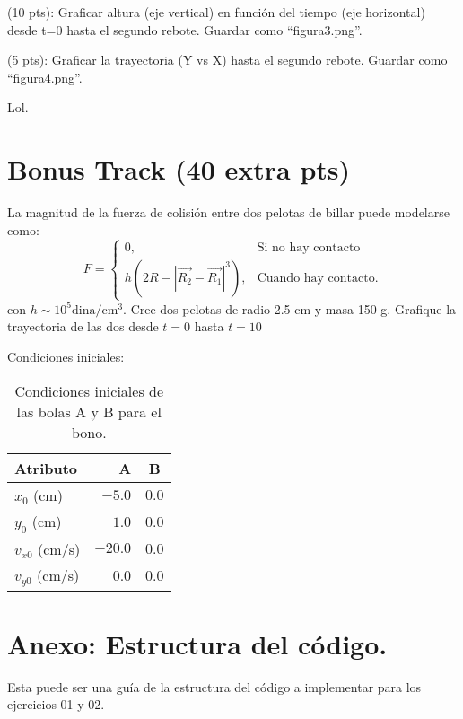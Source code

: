 \documentclass{article}
\begin{document}
(10 pts): Graficar altura (eje vertical) en función del tiempo (eje horizontal) desde t=0 hasta el segundo rebote. Guardar como ``figura3.png''.

(5 pts): Graficar la trayectoria (Y vs X) hasta el segundo rebote.
Guardar como ``figura4.png''.

Lol.

\section*{Bonus Track (40 extra pts)}

La magnitud de la fuerza de colisión entre dos pelotas de billar puede modelarse como:
\[  F = \left\{ \begin{array}{ll}
     0, & \text{Si no hay contacto}\\
     h (2R -  |\vec{R_2} - \vec{R_1}|^3), & \text{Cuando hay contacto.}
\end{array} 
\]con $h \sim 10^5 \mathrm{dina/cm^3}$. Cree dos pelotas de radio 2.5 cm y masa 150 g. Grafique la trayectoria de las dos desde $t=0$ hasta $t=10$

Condiciones iniciales:

\begin{table}[hb]
    \centering
    \begin{tabular}{l|r|c}
        Atributo & A & B \\ \hline
        $x_0$ (cm) & $-5.0$ & $0.0$ \\
        $y_0$ (cm) & $1.0$ & $0.0$ \\
        $v_{x0}$ (cm/s) & $+20.0$ & $0.0$ \\
        $v_{y0}$ (cm/s) & $0.0$ & $0.0$ \\
     \end{tabular}
    \caption{Condiciones iniciales de las bolas A y B para el bono.}
    \label{tab:my_label}
\end{table}




\section*{Anexo: Estructura del código.}
Esta puede ser una guía de la estructura del código a implementar para los ejercicios 01 y 02.
\end{document}

